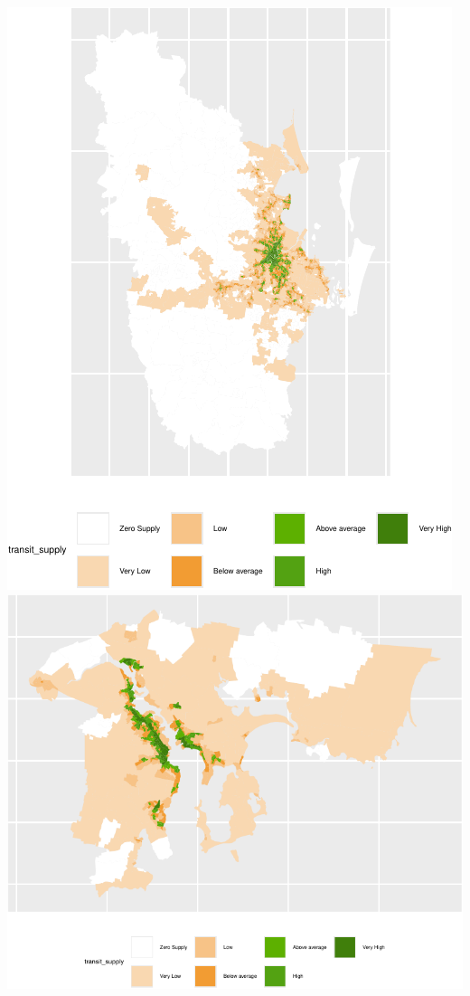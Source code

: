 \documentclass[preprint, 3p,
authoryear]{elsarticle} %
\begin{document}
\includegraphics{Leveraging_GTFS_to_assess_transit_supply_Transport_Geography_files/figure-latex/Australian_cities_2021-3.pdf}
\includegraphics{Leveraging_GTFS_to_assess_transit_supply_Transport_Geography_files/figure-latex/Australian_cities_2021-4.pdf}
\end{document}
